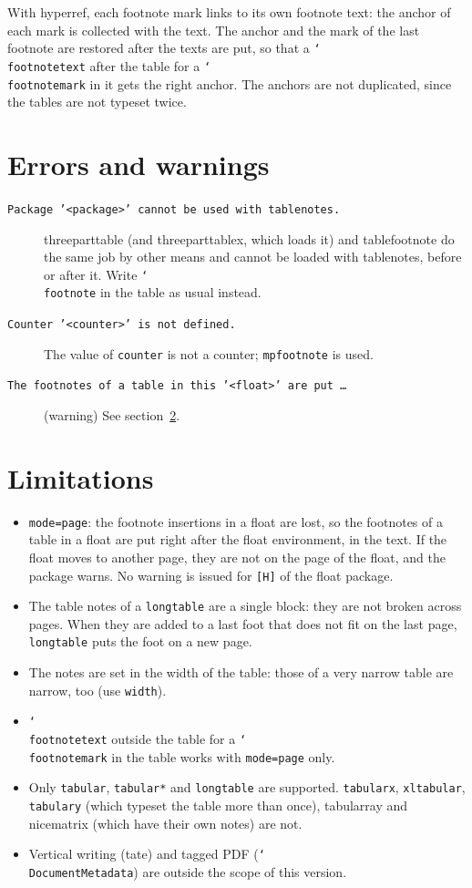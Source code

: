\documentclass{article}
\newcommand*\cs[1]{\texttt{\char`\\#1}}
\newcommand*\pkg[1]{\textsf{#1}}
\newcommand*\key[1]{\texttt{#1}}
\begin{document}
With \pkg{hyperref}, each footnote mark links to its own footnote text:
the anchor of each mark is collected with the text.  The anchor and the
mark of the last footnote are restored after the texts are put, so that
a \cs{footnotetext} after the table for a \cs{footnotemark} in it gets
the right anchor.  The anchors are not duplicated, since the tables are
not typeset twice.

\section{Errors and warnings}

\begin{description}
\item[\texttt{Package '<package>' cannot be used with tablenotes.}]
  \pkg{threeparttable} (and \pkg{threeparttablex}, which loads it) and
  \pkg{tablefootnote} do the same job by other means and cannot be
  loaded with \pkg{tablenotes}, before or after it.  Write
  \cs{footnote} in the table as usual instead.
\item[\texttt{Counter '<counter>' is not defined.}] The value of
  \key{counter} is not a counter; \texttt{mpfootnote} is used.
\item[\texttt{The footnotes of a table in this '<float>' are put \dots}]
  (warning) See section~\ref{sec:limitations}.
\end{description}

\section{Limitations}\label{sec:limitations}

\begin{itemize}
\item \key{mode=page}: the footnote insertions in a float are lost, so
  the footnotes of a table in a float are put right after the float
  environment, in the text.  If the float moves to another page, they
  are not on the page of the float, and the package warns.  No warning
  is issued for \texttt{[H]} of the \pkg{float} package.
\item The table notes of a \texttt{longtable} are a single block: they
  are not broken across pages.  When they are added to a last foot
  that does not fit on the last page, \texttt{longtable} puts the foot
  on a new page.
\item The notes are set in the width of the table: those of a very
  narrow table are narrow, too (use \key{width}).
\item \cs{footnotetext} outside the table for a \cs{footnotemark} in the
  table works with \key{mode=page} only.
\item Only \texttt{tabular}, \texttt{tabular*} and \texttt{longtable}
  are supported.  \texttt{tabularx}, \texttt{xltabular},
  \texttt{tabulary} (which typeset the table more than once),
  \pkg{tabularray} and \pkg{nicematrix} (which have their own notes)
  are not.
\item Vertical writing (tate) and tagged PDF (\cs{DocumentMetadata})
  are outside the scope of this version.
\end{itemize}
\end{document}
